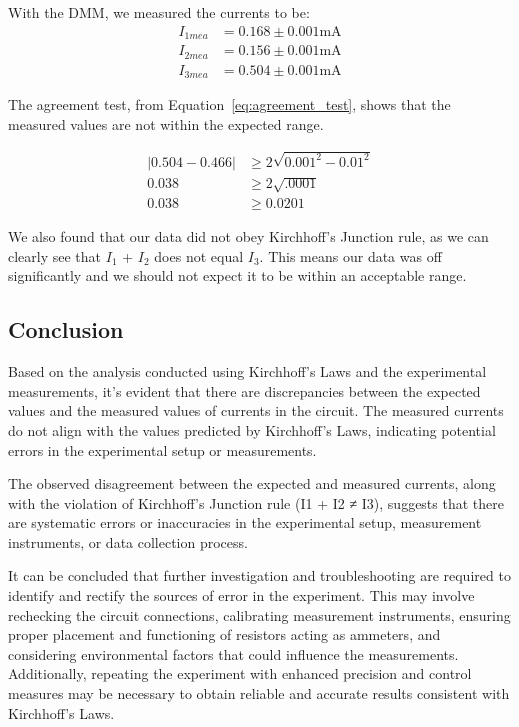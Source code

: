 \documentclass[11pt]{article}
\begin{document}
    With the DMM, we measured the currents to be:
    \begin{align*}
        I_{1mea} &= 0.168 \pm 0.001 \text{mA} \\
        I_{2mea} &= 0.156 \pm 0.001 \text{mA} \\
        I_{3mea} &= 0.504 \pm 0.001 \text{mA}
    \end{align*}

    The agreement test, from Equation~\ref{eq:agreement_test}, shows that the measured values are not within the expected range.
    \begin{e}
        \begin{align*}
            |0.504 - 0.466| &\ge 2 \sqrt{0.001^2 - 0.01^2} \\
            0.038 &\ge 2 \sqrt{.0001} \\
            0.038 &\ge 0.0201
        \end{align*}
    \end{e}

    We also found that our data did not obey Kirchhoff's Junction rule, as we can clearly see that $I_1$ + $I_2$ does not equal $I_3$. This means our data was off significantly and we should not expect it to be within an acceptable range.

    \subsection{Conclusion}\label{subsec:kirchoff_conclusion}

    Based on the analysis conducted using Kirchhoff's Laws and the experimental measurements, it's evident that there are discrepancies between the expected values and the measured values of currents in the circuit. The measured currents do not align with the values predicted by Kirchhoff's Laws, indicating potential errors in the experimental setup or measurements.

    The observed disagreement between the expected and measured currents, along with the violation of Kirchhoff's Junction rule (I1 + I2 ≠ I3), suggests that there are systematic errors or inaccuracies in the experimental setup, measurement instruments, or data collection process.
    
    It can be concluded that further investigation and troubleshooting are required to identify and rectify the sources of error in the experiment. This may involve rechecking the circuit connections, calibrating measurement instruments, ensuring proper placement and functioning of resistors acting as ammeters, and considering environmental factors that could influence the measurements. Additionally, repeating the experiment with enhanced precision and control measures may be necessary to obtain reliable and accurate results consistent with Kirchhoff's Laws.
\end{document}
